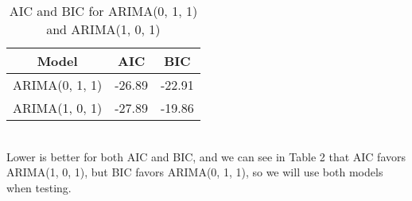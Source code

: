 \documentclass[12pt]{article}
\begin{document}
\begin{table}[h]
\begin{center}
\begin{tabular}{ |c|c|c| } 
 \hline
 \textbf{Model} & \textbf{AIC} & \textbf{BIC}\\
 \hline
 ARIMA(0, 1, 1) & -26.89 & -22.91\\ 
 \hline
 ARIMA(1, 0, 1) & -27.89 & -19.86\\ 
 \hline
\end{tabular}
\caption{AIC and BIC for ARIMA(0, 1, 1) and ARIMA(1, 0, 1)}
\label{table:Table 2}
\end{center}
\end{table}\\
Lower is better for both AIC and BIC, and we can see in Table 2 that AIC favors ARIMA(1, 0, 1), but BIC favors ARIMA(0, 1, 1), so we will use both models when testing.\\
\end{document}
